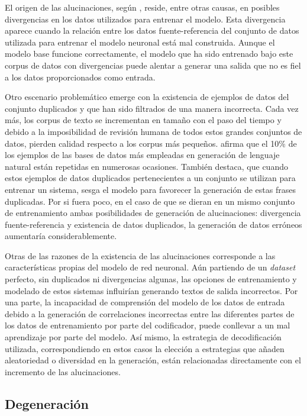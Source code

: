 El origen de las alucinaciones, según \cite{hallucination_survey}, reside, entre otras causas, en posibles divergencias en los datos utilizados para entrenar el modelo. Esta divergencia aparece cuando la relación entre los datos fuente-referencia del conjunto de datos utilizada para entrenar el modelo neuronal está mal construida. Aunque el modelo base funcione correctamente, el modelo que ha sido entrenado bajo este corpus de datos con divergencias puede alentar a generar una salida que no es fiel a los datos proporcionados como entrada. 

Otro escenario problemático emerge con la existencia de ejemplos de datos del conjunto duplicados y que han sido filtrados de una manera incorrecta. Cada vez más, los corpus de texto se incrementan en tamaño con el paso del tiempo y debido a la imposibilidad de revisión humana de todos estos grandes conjuntos de datos, pierden calidad respecto a los corpus más pequeños. \cite{lee2021deduplicating} afirma que el 10\% de los ejemplos de las bases de datos más empleadas en generación de lenguaje natural están repetidas en numerosas ocasiones. También destaca, que cuando estos ejemplos de datos duplicados pertenecientes a un conjunto se utilizan para entrenar un sistema, sesga el modelo para favorecer la generación de estas frases duplicadas. Por si fuera poco, en el caso de que se dieran en un mismo conjunto de entrenamiento ambas posibilidades de generación de alucinaciones: divergencia fuente-referencia y existencia de datos duplicados, la generación de datos erróneos aumentaría considerablemente.


Otras de las razones de la existencia de las alucinaciones corresponde a las características propias del modelo de red neuronal. Aún partiendo de un \textit{dataset} perfecto, sin duplicados ni divergencias algunas, las opciones de entrenamiento y modelado de estos sistemas influirían generando textos de salida incorrectos. Por una parte, la incapacidad de comprensión del modelo de los datos de entrada debido a la generación de correlaciones incorrectas entre las diferentes partes de los datos de entrenamiento por parte del codificador, puede conllevar a un mal aprendizaje por parte del modelo. Así mismo, la estrategia de decodificación utilizada, correspondiendo en estos casos la elección a estrategias que añaden aleatoriedad o diversidad en la generación, están relacionadas directamente con el incremento de las alucinaciones.

\subsection{Degeneración}

